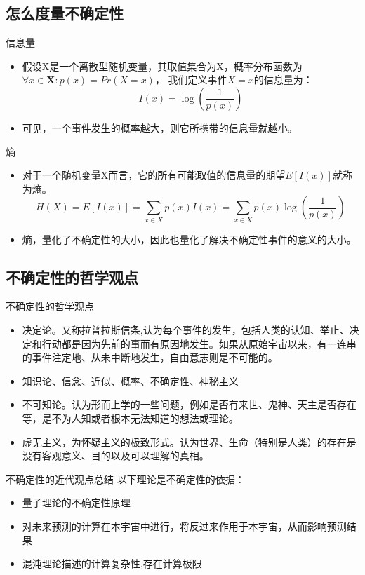 \documentclass{beamer}
\begin{document}
\subsection{怎么度量不确定性}
\begin{frame}{信息量}
  \begin{itemize}
    \item   假设X是一个离散型随机变量，其取值集合为X，概率分布函数为
      $\forall x \in \mathbf{X}:p(x)=Pr(X=x)$，
      我们定义事件$X=x$的信息量为：
  \begin{equation}
    I(x)=\log(\frac{1}{p(x)})
  \end{equation}

    \item 可见，一个事件发生的概率越大，则它所携带的信息量就越小。
  \end{itemize}

\end{frame}
\begin{frame}{熵}
  \begin{itemize}
    \item 对于一个随机变量X而言，它的所有可能取值的信息量的期望$E[I(x)]$就称为熵。
  \begin{equation}
    H(X)=E[I(x)]=\sum_{x \in X} p(x)I(x) 
    = \sum_{x \in X} p(x)\log(\frac{1}{p(x)})
  \end{equation}

    \item 熵，量化了不确定性的大小，因此也量化了解决不确定性事件的意义的大小。
  \end{itemize}
\end{frame}

\subsection{不确定性的哲学观点}
\begin{frame}{不确定性的哲学观点}
  \begin{itemize}
    \item 决定论。又称拉普拉斯信条,认为每个事件的发生，包括人类的认知、举止、决定和行动都是因为先前的事而有原因地发生。如果从原始宇宙以来，有一连串的事件注定地、从未中断地发生，自由意志则是不可能的。
    \item 知识论、信念、近似、概率、不确定性、神秘主义
    \item 不可知论。认为形而上学的一些问题，例如是否有来世、鬼神、天主是否存在等，是不为人知或者根本无法知道的想法或理论。
    \item 虚无主义，为怀疑主义的极致形式。认为世界、生命（特别是人类）的存在是没有客观意义、目的以及可以理解的真相。
  \end{itemize}
\end{frame}
\begin{frame}{不确定性的近代观点总结}
  以下理论是不确定性的依据：
  \begin{itemize}
    \item 量子理论的不确定性原理
    \item 对未来预测的计算在本宇宙中进行，将反过来作用于本宇宙，从而影响预测结果
    \item 混沌理论描述的计算复杂性,存在计算极限
  \end{itemize}
\end{frame}
\end{document}
